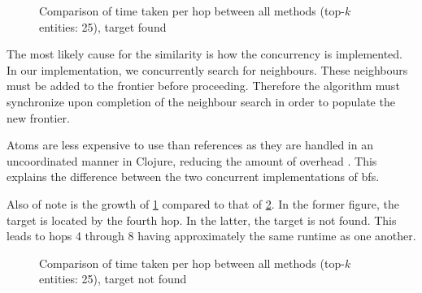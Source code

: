 				\begin{figure}[H]
					\centering
					
					
					\caption{Comparison of time taken per hop between all methods (top-\(k\) entities:  25), target found}
					\label{fig:method-runtime-tkes-25-stopsat4}
				\end{figure}
				
				The most likely cause for the similarity is how the concurrency is implemented.  In our implementation, we concurrently search for neighbours.  These neighbours must be added to the frontier before proceeding.  Therefore the algorithm must synchronize upon completion of the neighbour search in order to populate the new frontier.
				
				Atoms are less expensive to use than references as they are handled in an uncoordinated manner in Clojure, reducing the amount of overhead \cite{narkis-12}.  This explains the difference between the two concurrent implementations of \gls{bfs}.
				
				
				Also of note is the growth of \cref{fig:method-runtime-tkes-25-stopsat4} compared to that of \cref{fig:method-runtime-tkes-25}.  In the former figure, the target is located by the fourth hop.  In the latter, the target is not found.  This leads to hops 4 through 8 having approximately the same runtime as one another.
				
				\begin{figure}[H]
					\centering
					
					
					\caption{Comparison of time taken per hop between all methods (top-\(k\) entities:  25), target not found}
					\label{fig:method-runtime-tkes-25}
				\end{figure}